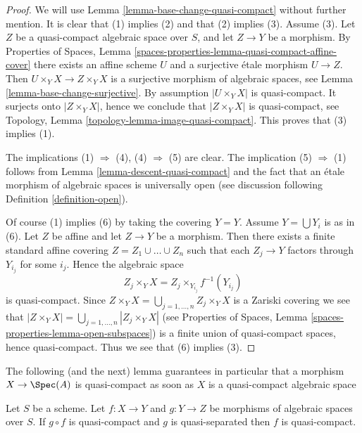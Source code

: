\begin{proof}
We will use Lemma \ref{lemma-base-change-quasi-compact}
without further mention.
It is clear that (1) implies (2) and that (2) implies (3).
Assume (3). Let $Z$ be a quasi-compact algebraic space over $S$,
and let $Z \to Y$ be a morphism. By
Properties of Spaces, Lemma
\ref{spaces-properties-lemma-quasi-compact-affine-cover}
there exists an affine scheme $U$ and a surjective \'etale morphism
$U \to Z$. Then $U \times_Y X \to Z \times_Y X$ is a surjective
morphism of algebraic spaces, see
Lemma \ref{lemma-base-change-surjective}.
By assumption $|U \times_Y X|$ is quasi-compact. It surjects
onto $|Z \times_Y X|$, hence we conclude that $|Z \times_Y X|$
is quasi-compact, see
Topology, Lemma \ref{topology-lemma-image-quasi-compact}.
This proves that (3) implies (1).

\medskip\noindent
The implications (1) $\Rightarrow$ (4), (4) $\Rightarrow$ (5) are clear.
The implication (5) $\Rightarrow$ (1) follows from
Lemma \ref{lemma-descent-quasi-compact}
and the fact that an \'etale morphism of algebraic spaces is universally open
(see discussion following
Definition \ref{definition-open}).

\medskip\noindent
Of course (1) implies (6) by taking the covering $Y = Y$.
Assume $Y = \bigcup Y_i$ is as in (6). Let $Z$ be affine and let
$Z \to Y$ be a morphism. Then there exists a finite standard affine
covering $Z = Z_1 \cup \ldots \cup Z_n$ such that each $Z_j \to Y$
factors through $Y_{i_j}$ for some $i_j$. Hence the algebraic space
$$
Z_j \times_Y X = Z_j \times_{Y_{i_j}} f^{-1}(Y_{i_j})
$$
is quasi-compact. Since
$Z \times_Y X = \bigcup_{j = 1, \ldots, n} Z_j \times_Y X$
is a Zariski covering we see that
$|Z \times_Y X| = \bigcup_{j = 1, \ldots, n} |Z_j \times_Y X|$
(see Properties of Spaces, Lemma \ref{spaces-properties-lemma-open-subspaces})
is a finite union of quasi-compact spaces, hence quasi-compact.
Thus we see that (6) implies (3).
\end{proof}

\noindent
The following (and the next) lemma guarantees in particular that a morphism
$X \to \Spec(A)$ is quasi-compact as soon as
$X$ is a quasi-compact algebraic space

\begin{lemma}
\label{lemma-quasi-compact-permanence}
Let $S$ be a scheme.
Let $f : X \to Y$ and $g : Y \to Z$ be morphisms of algebraic spaces over $S$.
If $g \circ f$ is quasi-compact and $g$ is quasi-separated
then $f$ is quasi-compact.
\end{lemma}


